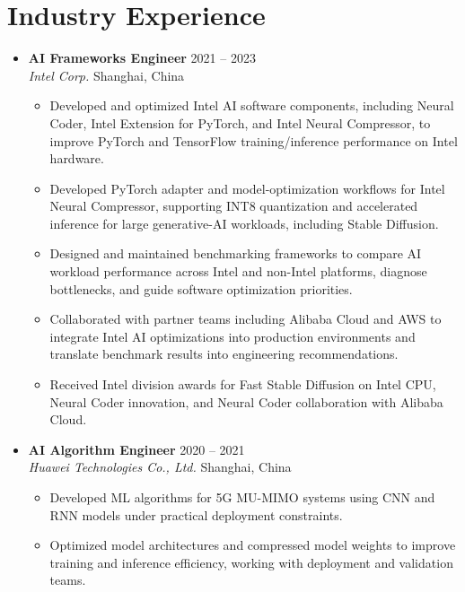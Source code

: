 \documentclass[10pt,a4paper]{article}
\newcommand{\entry}[4]{%
    \item \textbf{#1} \hfill #4\\
    \textit{#2} \hfill #3
}
\begin{document}
\section*{Industry Experience}
\begin{itemize}
    \entry{AI Frameworks Engineer}{Intel Corp.}{Shanghai, China}{2021 -- 2023}
    \begin{itemize}
        \item Developed and optimized Intel AI software components, including Neural Coder, Intel Extension for PyTorch, and Intel Neural Compressor, to improve PyTorch and TensorFlow training/inference performance on Intel hardware.
        \item Developed PyTorch adapter and model-optimization workflows for Intel Neural Compressor, supporting INT8 quantization and accelerated inference for large generative-AI workloads, including Stable Diffusion.
        \item Designed and maintained benchmarking frameworks to compare AI workload performance across Intel and non-Intel platforms, diagnose bottlenecks, and guide software optimization priorities.
        \item Collaborated with partner teams including Alibaba Cloud and AWS to integrate Intel AI optimizations into production environments and translate benchmark results into engineering recommendations.
        \item Received Intel division awards for Fast Stable Diffusion on Intel CPU, Neural Coder innovation, and Neural Coder collaboration with Alibaba Cloud.
    \end{itemize}

    \entry{AI Algorithm Engineer}{Huawei Technologies Co., Ltd.}{Shanghai, China}{2020 -- 2021}
    \begin{itemize}
        \item Developed ML algorithms for 5G MU-MIMO systems using CNN and RNN models under practical deployment constraints.
        \item Optimized model architectures and compressed model weights to improve training and inference efficiency, working with deployment and validation teams.
    \end{itemize}
\end{itemize}
\end{document}
